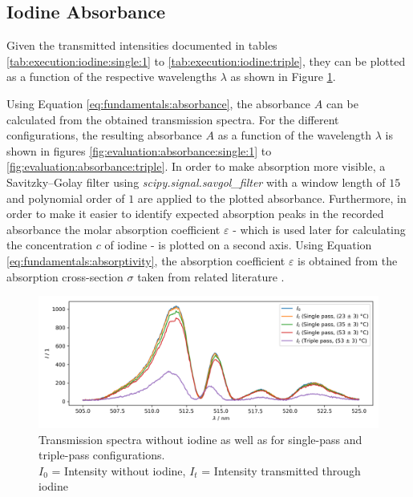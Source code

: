 \subsection{Iodine Absorbance}
\label{sec:evaluation:iodine-absorbance}

Given the transmitted intensities documented in tables \ref{tab:execution:iodine:single:1} to \ref{tab:execution:iodine:triple}, they can be plotted as a function of the respective wavelengths $\lambda$ as shown in Figure \ref{fig:evaluation:transmission}.

Using Equation \ref{eq:fundamentals:absorbance}, the absorbance $A$ can be calculated from the obtained transmission spectra. For the different configurations, the resulting absorbance $A$ as a function of the wavelength $\lambda$ is shown in figures \ref{fig:evaluation:absorbance:single:1} to \ref{fig:evaluation:absorbance:triple}. In order to make absorption more visible, a Savitzky–Golay filter using \textit{scipy.signal.savgol\_filter} with a window length of $15$ and polynomial order of $1$ are applied to the plotted absorbance. Furthermore, in order to make it easier to identify expected absorption peaks in the recorded absorbance the molar absorption coefficient $\varepsilon$ - which is used later for calculating the concentration $c$ of iodine - is plotted on a second axis. Using Equation \ref{eq:fundamentals:absorptivity}, the absorption coefficient $\varepsilon$ is obtained from the absorption cross-section $\sigma$ taken from related literature \cite{Iodine}.

\begin{figure}[H]
    \centering
    \includegraphics[width=\textwidth]{graphics/transmission.png}
    \caption{Transmission spectra without iodine as well as for single-pass and triple-pass configurations.\\
        $I_0$ = Intensity without iodine, $I_t$ = Intensity transmitted through iodine}
    \label{fig:evaluation:transmission}
\end{figure}

